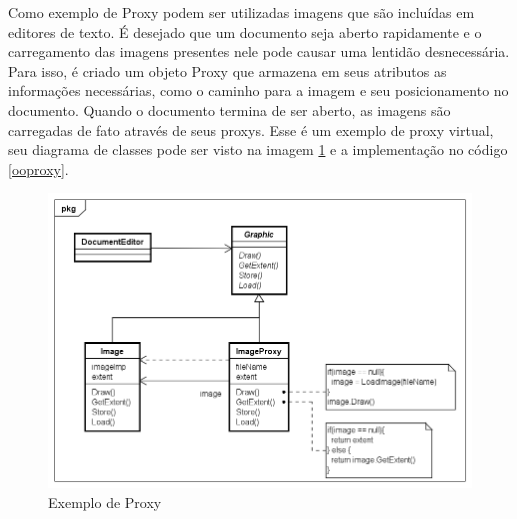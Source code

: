 Como exemplo de Proxy podem ser utilizadas 
imagens que são incluídas em editores de 
texto. É desejado que um documento seja aberto 
rapidamente e o carregamento das imagens 
presentes nele pode causar uma lentidão 
desnecessária. Para isso, é criado um objeto 
Proxy que armazena em seus atributos as 
informações necessárias, como o caminho 
para a imagem e seu posicionamento no 
documento. Quando o documento termina de 
ser aberto, as imagens são carregadas de 
fato através de seus proxys. Esse é um 
exemplo de proxy virtual, seu diagrama de 
classes pode ser visto na imagem \ref{proxy_exemplo} 
e a implementação no código \ref{ooproxy}.

\begin{figure}[htb]
	\caption{\label{proxy_exemplo}Exemplo de Proxy}
	\begin{center}
	    \includegraphics[scale=0.5]{5_padroes-contexto-funcional/5.2_estruturais/5.2.7_proxy/proxy_exemplo.png}
	\end{center}
\end{figure}

